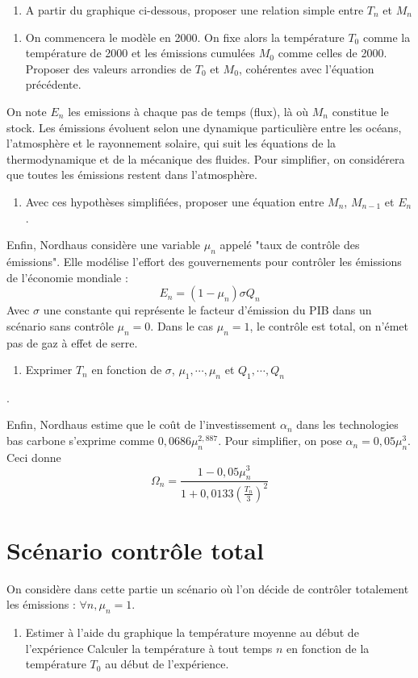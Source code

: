 \documentclass[12pt]{article}
\newcommand{\tco}{tCO_2eq}
\newcommand{\ques}[1]{\begin{enumerate}[resume]
\item  #1
\end{enumerate}}
\newcommand{\rep}[1]{\textit{Réponse :} #1 \\}
\renewcommand{\rep}[1]{ }
\theoremstyle{remark}
\begin{document}
\ques{A partir du graphique ci-dessous, proposer une relation simple entre $T_n$ et $M_n$}
\rep{\begin{equation*} T_n= \frac{M_n}{2000}\end{equation*}}

\ques{On commencera le modèle en 2000. On fixe alors la température $T_0$ comme la température de 2000 et les émissions cumulées $M_0$ comme celles de 2000.
Proposer des valeurs arrondies de $T_0$ et $M_0$, cohérentes avec l'équation précédente.}
\rep{$T_0 = 0,8$ °C, $M_0 = 1600$ G$\tco$}

On note $E_n$ les emissions à chaque pas de temps (flux), là où $M_n$ constitue le stock.
Les émissions évoluent selon une dynamique particulière entre les océans, l'atmosphère et le rayonnement solaire, qui suit les équations de la thermodynamique et de la mécanique des fluides.
Pour simplifier, on considérera que toutes les émissions restent dans l'atmosphère.
\ques{ Avec ces hypothèses simplifiées, proposer une équation entre $M_n$, $M_{n-1}$ et $E_n$.}
\rep{$M_n =M_{n-1} +E_n$}

Enfin, Nordhaus considère une variable $\mu_n$ appelé "taux de contrôle des émissions".
Elle modélise l'effort des gouvernements pour contrôler les émissions de l'économie mondiale :
\begin{equation*}
E_n=(1-\mu_n)\sigma Q_n
\end{equation*}
Avec $\sigma$ une constante qui représente le facteur d'émission du PIB dans un scénario sans contrôle $\mu_n=0$. 
Dans le cas $\mu_n=1$, le contrôle est total, on n'émet pas de gaz à effet de serre.
\ques{Exprimer $T_n$ en fonction de $\sigma$, $\mu_1, \cdots, \mu_n$ et $Q_1, \cdots ,Q_n$}.
\rep{\begin{equation*}T_n= T_0+\frac{\sigma}{2000} \sum_{k=1}^n (1-\mu_k) Q_k  \end{equation*}}

Enfin, Nordhaus estime que le coût de l'investissement $\alpha_n$ dans les technologies bas carbone s'exprime comme $0,0686 \mu_n^{2,887}$. Pour simplifier, on pose $\alpha_n = 0,05\mu_n^3$. Ceci donne 
\begin{equation*}
\Omega_n = \frac{1-0,05\mu_n^3}{1+0,0133 (\frac{T_n}{3})^2}
\end{equation*}

\section{Scénario contrôle total}
On considère dans cette partie un scénario où l'on décide de contrôler totalement les émissions : $\forall n, \mu_n=1$.
\ques{Estimer à l'aide du graphique la température moyenne au début de l'expérience Calculer la température à tout temps $n$ en fonction de la température $T_0$ au début de l'expérience. }
\rep{$\forall n, T_n =T_0 = 0,8$°C.}
\end{document}
